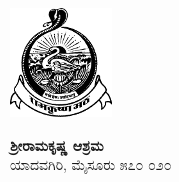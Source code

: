 \thispagestyle{empty}


\begin{center}
\includegraphics{"images/logo.png"}
\end{center}

\textbf{ಶ್ರೀರಾಮಕೃಷ್ಣ ಆಶ್ರಮ}\\ಯಾದವಗಿರಿ, ಮೈಸೂರು ೫೭೦ ೦೨೦

